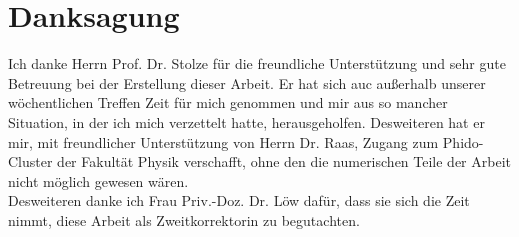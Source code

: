 \chapter*{Danksagung}
Ich danke Herrn Prof. Dr. Stolze für die freundliche Unterstützung und sehr gute Betreuung bei der Erstellung dieser Arbeit. Er hat sich auc außerhalb unserer wöchentlichen Treffen Zeit für mich genommen und mir aus so mancher Situation, in der ich mich verzettelt hatte, herausgeholfen. Desweiteren hat er mir, mit freundlicher Unterstützung von Herrn Dr. Raas, Zugang zum Phido-Cluster der Fakultät Physik verschafft, ohne den die numerischen Teile der Arbeit nicht möglich gewesen wären.\\
Desweiteren danke ich Frau Priv.-Doz. Dr. Löw dafür, dass sie sich die Zeit nimmt, diese Arbeit als Zweitkorrektorin zu begutachten. \\

\thispagestyle{empty}
